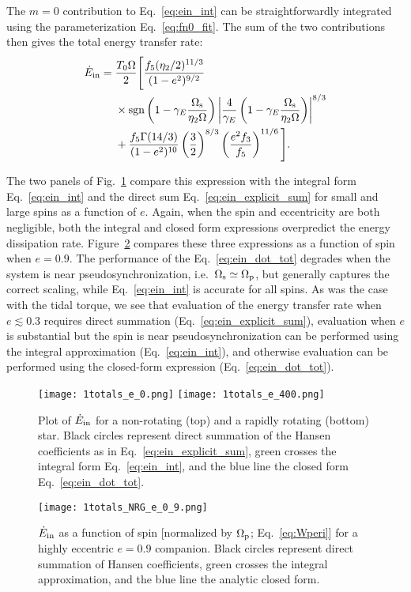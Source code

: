 \documentclass[
        fleqn,
        usenatbib,
    ]{mnras}
\newcommand*{\p}[1]{\left(#1\right)}
\begin{document}
The $m = 0$ contribution to Eq.~\eqref{eq:ein_int} can be straightforwardly
integrated using the parameterization Eq.~\eqref{eq:fn0_fit}. The sum of the two
contributions then gives the total energy transfer rate:
\begin{align}
    \dot{E}_{\rm in} ={}& \frac{T_0 \Omega}{2}\Bigg[\frac{f_5
        (\eta_2/2)^{11/3}}{(1-e^2)^{9/2}} \nonumber\\
        &\times \mathrm{sgn}\p{1 - \gamma_E\frac{\Omega_{\rm s}}{\eta_2 \Omega}}
            \left|\frac{4}{\gamma_{E}}
            \p{1 - \gamma_E\frac{\Omega_{\rm s}}{\eta_2 \Omega}}\right|^{8/3}
            \nonumber\\
        &+
    \frac{f_5 \Gamma(14 / 3)}{(1 - e^2)^{10}} \left(\frac{3}{2}\right)^{8/3}
            \left(\frac{e^2 f_3}{f_5}\right)^{11/6}\Bigg].
            \label{eq:ein_dot_tot}
\end{align}

The two panels of Fig.~\ref{fig:e0} compare this expression with the integral
form Eq.~\eqref{eq:ein_int} and the direct sum Eq.~\eqref{eq:ein_explicit_sum}
for small and large spins as a function of $e$. Again, when the spin and
eccentricity are both negligible, both the integral and closed form expressions
overpredict the energy dissipation rate. Figure~\ref{fig:e_spin} compares these
three expressions as a function of spin when $e = 0.9$. The performance of the
Eq.~\eqref{eq:ein_dot_tot} degrades when the system is near
pseudosynchronization, i.e.\ $\Omega_{\rm s} \simeq \Omega_{\rm p}$, but
generally captures the correct scaling, while Eq.~\eqref{eq:ein_int} is accurate
for all spins. As was the case with the tidal torque, we see that evaluation of
the energy transfer rate when $e \lesssim 0.3$ requires direct summation
(Eq.~\ref{eq:ein_explicit_sum}), evaluation when $e$ is substantial but the spin
is near pseudosynchronization can be performed using the integral approximation
(Eq.~\ref{eq:ein_int}), and otherwise evaluation can be performed using the
closed-form expression (Eq.~\ref{eq:ein_dot_tot}).
\begin{figure}
    \centering
    \texttt{[image: 1totals\_e\_0.png]}
    \texttt{[image: 1totals\_e\_400.png]}
    \caption{Plot of $\dot{E}_{\rm in}$ for a non-rotating (top) and a rapidly
    rotating (bottom) star. Black circles represent direct summation of the
    Hansen coefficients as in Eq.~\eqref{eq:ein_explicit_sum}, green crosses
    the integral form Eq.~\eqref{eq:ein_int}, and the blue line the closed form
    Eq.~\eqref{eq:ein_dot_tot}. }\label{fig:e0}
\end{figure}
\begin{figure}
    \centering
    \texttt{[image: 1totals\_NRG\_e\_0\_9.png]}
    \caption{$\dot{E}_{\rm in}$ as a function of spin [normalized by
    $\Omega_{\rm p}$; Eq.~\eqref{eq:Wperi}] for a highly eccentric $e = 0.9$
    companion. Black circles represent direct summation of Hansen coefficients,
    green crosses the integral approximation, and the blue line the analytic
    closed form. }\label{fig:e_spin}
\end{figure}
\end{document}
